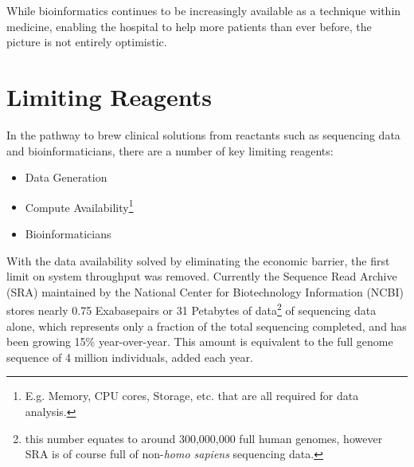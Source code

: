 


While bioinformatics continues to be increasingly available as a technique within medicine, enabling the hospital to help more patients than ever before, the picture is not entirely optimistic.

\section{Limiting Reagents}  %

In the pathway to brew clinical solutions from reactants such as sequencing data and bioinformaticians, there are a number of key limiting reagents:

\begin{itemize}
	\itemsep0em
	\item Data Generation %
	\item Compute Availability\footnote{E.g. Memory, CPU cores, Storage, etc. that are all required for data analysis.}
	\item Bioinformaticians
\end{itemize}

With the data availability solved\cite{Stephens_2015} by eliminating the economic barrier, the first limit on system throughput was removed.
Currently the Sequence Read Archive (SRA) maintained by the National Center for Biotechnology Information (NCBI) stores nearly 0.75 Exabasepairs or 31 Petabytes of data\footnote{this number equates to around 300,000,000 full human genomes, however SRA is of course full of non-\textit{homo sapiens} sequencing data.} of sequencing data alone\cite{sra-growth}, which represents only a fraction of the total sequencing completed, and has been growing 15\% year-over-year. This amount is equivalent to the full genome sequence of 4 million individuals, added each year.

